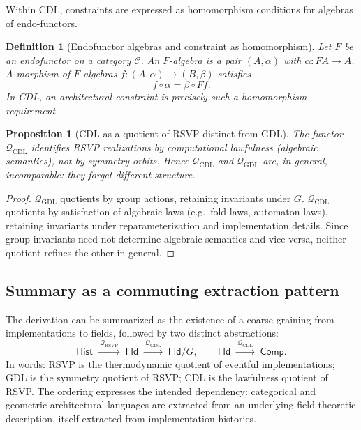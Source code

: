 \documentclass[11pt]{article}
\newtheorem{definition}{Definition}
\newtheorem{proposition}{Proposition}
\begin{document}
Within CDL, constraints are expressed as homomorphism conditions for algebras of
endo-functors.

\begin{definition}[Endofunctor algebras and constraint as homomorphism]
Let $F$ be an endofunctor on a category $\mathcal{C}$. An $F$-algebra is a pair
$(A,\alpha)$ with $\alpha:FA\to A$. A morphism of $F$-algebras
$f:(A,\alpha)\to(B,\beta)$ satisfies
\[
f\circ \alpha = \beta \circ Ff.
\]
In CDL, an architectural \emph{constraint} is precisely such a homomorphism
requirement.
\end{definition}

\begin{proposition}[CDL as a quotient of RSVP distinct from GDL]
The functor $\mathcal{Q}_{\mathrm{CDL}}$ identifies RSVP realizations by
computational lawfulness (algebraic semantics), not by symmetry orbits. Hence
$\mathcal{Q}_{\mathrm{CDL}}$ and $\mathcal{Q}_{\mathrm{GDL}}$ are, in general,
incomparable: they forget different structure.
\end{proposition}

\begin{proof}
$\mathcal{Q}_{\mathrm{GDL}}$ quotients by group actions, retaining invariants under
$G$. $\mathcal{Q}_{\mathrm{CDL}}$ quotients by satisfaction of algebraic laws (e.g.\
fold laws, automaton laws), retaining invariants under reparameterization and
implementation details. Since group invariants need not determine algebraic
semantics and vice versa, neither quotient refines the other in general.
\end{proof}

\subsection{Summary as a commuting extraction pattern}

The derivation can be summarized as the existence of a coarse-graining from
implementations to fields, followed by two distinct abstractions:
\[
\mathsf{Hist}
\;\xrightarrow{\ \mathcal{Q}_{\mathrm{RSVP}}\ }\;
\mathsf{Fld}
\;\xrightarrow{\ \mathcal{Q}_{\mathrm{GDL}}\ }\;
\mathsf{Fld}/G,
\qquad
\mathsf{Fld}
\;\xrightarrow{\ \mathcal{Q}_{\mathrm{CDL}}\ }\;
\mathsf{Comp}.
\]
In words: RSVP is the thermodynamic quotient of eventful implementations; GDL is
the symmetry quotient of RSVP; CDL is the lawfulness quotient of RSVP. The
ordering expresses the intended dependency: categorical and geometric
architectural languages are extracted from an underlying field-theoretic
description, itself extracted from implementation histories.
\end{document}
